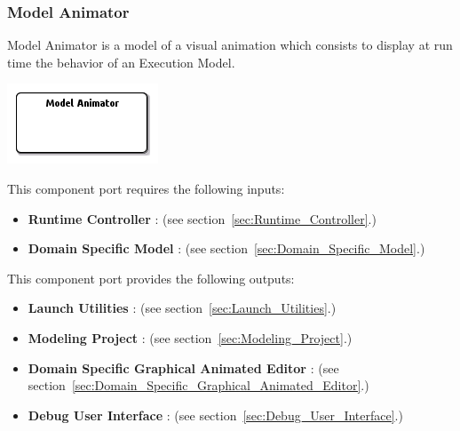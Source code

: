 \documentclass{gemoc} %
\begin{document}
\subsubsection{Model Animator}
\label{sec:Model_Animator}
Model Animator is a model of a visual animation which consists to display at run time the behavior of an Execution Model.
\begin{center}
\includegraphics*[trim=0.0cm 0.0cm 0cm 0.0cm, clip=true]{../images/generated/Generated_Model_Animator.png}
\end{center}

This component port requires the following inputs:
\begin{itemize}
  \item \textbf{Runtime Controller} :
(see section~\ref{sec:Runtime_Controller}.)
  \item \textbf{Domain Specific Model} :
(see section~\ref{sec:Domain_Specific_Model}.)
\end{itemize}

This component port provides the following outputs:
\begin{itemize}
  \item \textbf{Launch Utilities} :
(see section~\ref{sec:Launch_Utilities}.)
  \item \textbf{Modeling Project} :
(see section~\ref{sec:Modeling_Project}.)
  \item \textbf{Domain Specific Graphical Animated Editor} :
(see section~\ref{sec:Domain_Specific_Graphical_Animated_Editor}.)
  \item \textbf{Debug User Interface} :
(see section~\ref{sec:Debug_User_Interface}.)
\end{itemize}
\end{document}
